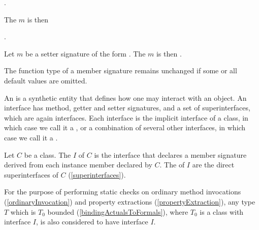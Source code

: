 \documentclass[makeidx]{article}
\begin{document}
\noindent
{}

\noindent
{}.

\noindent
The  $m$ is then

\noindent
{}.

\LMHash{}%
Let $m$ be a setter signature of the form
.
The  $m$ is then
.

\LMHash{}%
The function type of a member signature remains unchanged if
some or all default values are omitted.


\LMHash{}%
An  is a synthetic entity that defines
how one may interact with an object.
An interface has method, getter and setter signatures,
and a set of superinterfaces,
which are again interfaces.
Each interface is the implicit interface of a class,
in which case we call it a
,
or a combination of several other interfaces,
in which case we call it a
.

\LMHash{}%
Let $C$ be a class.
The  $I$ of $C$ is the interface that declares
a member signature derived from
each instance member declared by $C$.
The  of $I$ are the direct superinterfaces of $C$
(\ref{superinterfaces}).


\LMHash{}%
For the purpose of performing static checks on ordinary method invocations
(\ref{ordinaryInvocation})
and property extractions
(\ref{propertyExtraction}),
any type $T$ which is $T_0$ bounded
(\ref{bindingActualsToFormals}),
where $T_0$ is a class with interface $I$,
is also considered to have interface $I$.
\end{document}
